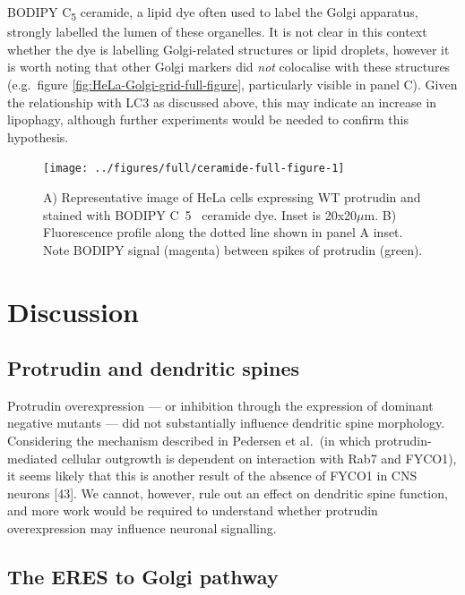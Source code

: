 \documentclass[
  12pt,
  a4paper,
]{book}
\begin{document}
BODIPY C\textsubscript{5} ceramide, a lipid dye often used to label the Golgi apparatus, strongly labelled the lumen of these organelles. It is not clear in this context whether the dye is labelling Golgi-related structures or lipid droplets, however it is worth noting that other Golgi markers did \emph{not} colocalise with these structures (e.g.~figure \ref{fig:HeLa-Golgi-grid-full-figure}, particularly visible in panel C). Given the relationship with LC3 as discussed above, this may indicate an increase in lipophagy, although further experiments would be needed to confirm this hypothesis.

\begin{figure}
\texttt{[image: ../figures/full/ceramide-full-figure-1]} \caption[Protrudin effect on BODIPY C$\textsubscript{5}$ ceramide localisation in HeLa cells]{A) Representative image of HeLa cells expressing WT protrudin and stained with BODIPY C~5~ ceramide dye.  Inset is 20x20$\mu$m.  B) Fluorescence profile along the dotted line shown in panel A inset.  Note BODIPY signal (magenta) between spikes of protrudin (green).}\label{fig:ceramide-full-figure}
\end{figure}

\hypertarget{discussion}{%
\section{Discussion}\label{discussion}}

\hypertarget{protrudin-and-dendritic-spines}{%
\subsection{Protrudin and dendritic spines}\label{protrudin-and-dendritic-spines}}

Protrudin overexpression --- or inhibition through the expression of dominant negative mutants --- did not substantially influence dendritic spine morphology. Considering the mechanism described in Pedersen et al.~(in which protrudin-mediated cellular outgrowth is dependent on interaction with Rab7 and FYCO1), it seems likely that this is another result of the absence of FYCO1 in CNS neurons {[}43{]}. We cannot, however, rule out an effect on dendritic spine function, and more work would be required to understand whether protrudin overexpression may influence neuronal signalling.

\hypertarget{the-eres-to-golgi-pathway}{%
\subsection{The ERES to Golgi pathway}\label{the-eres-to-golgi-pathway}}
\end{document}
